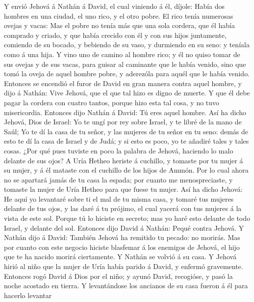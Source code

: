  Y envió Jehová á Nathán á David, el cual viniendo á él,
díjole: Había dos hombres en una ciudad, el uno rico, y el otro pobre.
 El rico tenía numerosas ovejas y vacas: 
Mas el pobre no tenía más que una sola cordera, que él había comprado y
criado, y que había crecido con él y con sus hijos juntamente, comiendo
de su bocado, y bebiendo de su vaso, y durmiendo en su seno: y teníala
como á una hija.  Y vino uno de camino al hombre rico; y
él no quiso tomar de sus ovejas y de sus vacas, para guisar al caminante
que le había venido, sino que tomó la oveja de aquel hombre pobre, y
aderezóla para aquél que le había venido.  Entonces se
encendió el furor de David en gran manera contra aquel hombre, y dijo á
Nathán: Vive Jehová, que el que tal hizo es digno de muerte.
 Y que él debe pagar la cordera con cuatro tantos, porque
hizo esta tal cosa, y no tuvo misericordia.  Entonces dijo
Nathán á David: Tú eres aquel hombre. Así ha dicho Jehová, Dios de
Israel: Yo te ungí por rey sobre Israel, y te libré de la mano de Saúl;
 Yo te dí la casa de tu señor, y las mujeres de tu señor
en tu seno: demás de esto te dí la casa de Israel y de Judá; y si esto
es poco, yo te añadiré tales y tales cosas.  ¿Por qué pues
tuviste en poco la palabra de Jehová, haciendo lo malo delante de sus
ojos? A Uría Hetheo heriste á cuchillo, y tomaste por tu mujer á su
mujer, y á él mataste con el cuchillo de los hijos de Ammón.
 Por lo cual ahora no se apartará jamás de tu casa la
espada; por cuanto me menospreciaste, y tomaste la mujer de Uría Hetheo
para que fuese tu mujer.  Así ha dicho Jehová: He aquí yo
levantaré sobre ti el mal de tu misma casa, y tomaré tus mujeres delante
de tus ojos, y las daré á tu prójimo, el cual yacerá con tus mujeres á
la vista de este sol.  Porque tú lo hiciste en secreto;
mas yo haré esto delante de todo Israel, y delante del sol.
 Entonces dijo David á Nathán: Pequé contra Jehová. Y
Nathán dijo á David: También Jehová ha remitido tu pecado: no morirás.
 Mas por cuanto con este negocio hiciste blasfemar á los
enemigos de Jehová, el hijo que te ha nacido morirá ciertamente.
 Y Nathán se volvió á su casa. Y Jehová hirió al niño que
la mujer de Uría había parido á David, y enfermó gravemente.
 Entonces rogó David á Dios por el niño; y ayunó David,
recogióse, y pasó la noche acostado en tierra.  Y
levantándose los ancianos de su casa fueron á él para hacerlo levantar
